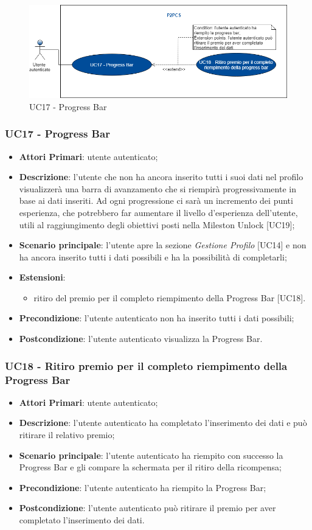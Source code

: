 \begin{figure}[h]
	\includegraphics[width=13cm]{res/images/Schemagenerale7.png}
	\centering
	\caption{UC17 - Progress Bar}
\end{figure}
\subsubsection{UC17 - Progress Bar}
\begin{itemize}
	\item \textbf{Attori Primari}: utente autenticato;
	\item \textbf{Descrizione}: l'utente che non ha ancora inserito tutti i suoi dati nel profilo visualizzerà una barra di avanzamento che si riempirà progressivamente in base ai dati inseriti. Ad ogni progressione ci sarà un incremento dei punti esperienza, che potrebbero far aumentare il livello d'esperienza dell'utente, utili al raggiungimento degli obiettivi posti nella Mileston Unlock [UC19];
	\item \textbf{Scenario principale}: l'utente apre la sezione \textit{Gestione Profilo} [UC14] e non ha ancora inserito tutti i dati possibili e ha la possibilità di completarli;
	\item \textbf{Estensioni}:
	\begin{itemize}
		\item ritiro del premio per il completo riempimento della Progress Bar [UC18].
	\end{itemize}
	\item \textbf{Precondizione}: l'utente autenticato non ha inserito tutti i dati possibili;
	\item \textbf{Postcondizione}: l'utente autenticato visualizza la Progress Bar.
\end{itemize}
\subsubsection{UC18 - Ritiro premio per il completo riempimento della Progress Bar}
\begin{itemize}
	\item \textbf{Attori Primari}: utente autenticato;
	\item \textbf{Descrizione}: l'utente autenticato ha completato l'inserimento dei dati e può ritirare il relativo premio;	
	\item \textbf{Scenario principale}: l'utente autenticato ha riempito con successo la Progress Bar e gli compare la schermata per il ritiro della ricompensa;
	\item \textbf{Precondizione}: l'utente autenticato ha riempito la Progress Bar;
	\item \textbf{Postcondizione}: l'utente autenticato può ritirare il premio per aver completato l'inserimento dei dati.
\end{itemize}
